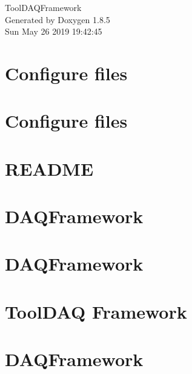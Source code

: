 \documentclass[twoside]{book}
\newcommand{\clearemptydoublepage}{%
  \newpage{\pagestyle{empty}\cleardoublepage}%
}
\begin{document}
\hypersetup{pageanchor=false}
\begin{titlepage}
\vspace*{7cm}
\begin{center}%
{\Large Tool\-D\-A\-Q\-Framework }\\
\vspace*{1cm}
{\large Generated by Doxygen 1.8.5}\\
\vspace*{0.5cm}
{\small Sun May 26 2019 19:42:45}\\
\end{center}
\end{titlepage}
\clearemptydoublepage
\tableofcontents
\clearemptydoublepage
{}
\hypersetup{pageanchor=true}

\chapter{Configure files}
\label{md_configfiles_README}
\hypertarget{md_configfiles_README}{}

\chapter{Configure files}
\label{md_configfiles_template_README}
\hypertarget{md_configfiles_template_README}{}

\chapter{R\-E\-A\-D\-M\-E}
\label{md_DataModel_README}
\hypertarget{md_DataModel_README}{}

\chapter{D\-A\-Q\-Framework}
\label{md_include_README}
\hypertarget{md_include_README}{}

\chapter{D\-A\-Q\-Framework}
\label{md_lib_README}
\hypertarget{md_lib_README}{}

\chapter{Tool\-D\-A\-Q Framework}
\label{md_README}
\hypertarget{md_README}{}

\chapter{D\-A\-Q\-Framework}
\label{md_src_Store_README}
\hypertarget{md_src_Store_README}{}

\end{document}
